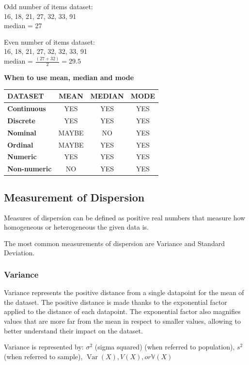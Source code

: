 \documentclass{article}
\begin{document}
Odd number of items dataset:\\
16, 18, 21, 27, 32, 33, 91\\
median = 27

Even number of items dataset:\\
16, 18, 21, 27, 32, 32, 33, 91\\
median = $\frac{(27 + 32)}{2} = 29.5$ 

\textbf{When to use mean, median and mode}

\begin{center}
\begin{tabular}{|l|c|c|c|}
\hline
DATASET & MEAN & MEDIAN & MODE \\ \hline
\textbf{Continuous} & YES & YES & YES \\ 
\textbf{Discrete} & YES & YES & YES \\ 
\textbf{Nominal} & MAYBE & NO & YES \\
\textbf{Ordinal} & MAYBE & YES & YES \\
\textbf{Numeric} & YES & YES & YES \\
\textbf{Non-numeric} & NO & YES & YES \\ 
\hline
\end{tabular}
\end{center}

\subsection{Measurement of Dispersion}
Measures of dispersion can be defined as positive real numbers that measure how homogeneous or heterogeneous the given data is. 

The most common measurements of dispersion are Variance and Standard Deviation. 

\subsubsection{Variance}
Variance represents the positive distance from a single datapoint for the mean of the dataset. The positive distance is made thanks to the exponential factor applied to the distance of each datapoint. 
The exponential factor also magnifies values that are more far from the mean in respect to smaller values, allowing to better understand their impact on the dataset. 

Variance is represented by: $\sigma ^{2}$ (sigma squared) (when referred to population), ${\displaystyle s^{2}}$ (when referred to sample), ${\displaystyle \operatorname {Var} (X)}, {\displaystyle V(X)}, or {\displaystyle \mathbb {V} (X)}$
\end{document}

